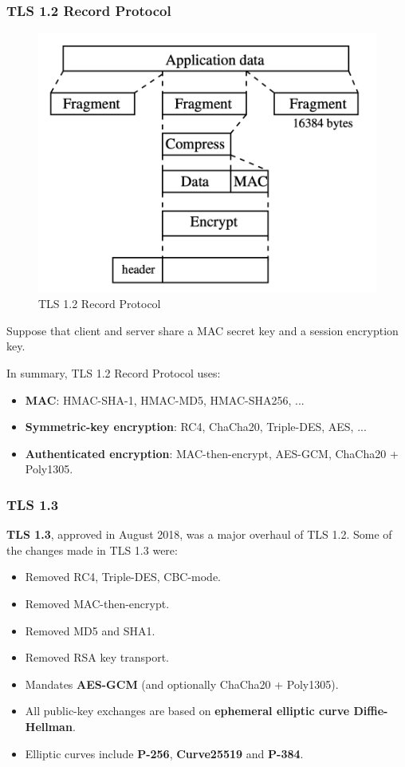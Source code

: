 \documentclass[12pt,titlepage]{article}
\begin{document}
\subsubsection{TLS 1.2 Record Protocol}
\begin{center}
	\begin{figure}[h!]
		\centering
		\includegraphics[width=\textwidth]{TLS_1_2_Record_Protocol.png}
		\caption{TLS 1.2 Record Protocol}
	\end{figure}
	Suppose that client and server share a MAC secret key and a session encryption key.
\end{center}
In summary, TLS 1.2 Record Protocol uses: \begin{itemize}
	\item \textbf{MAC}: HMAC-SHA-1, HMAC-MD5, HMAC-SHA256, ...
	\item \textbf{Symmetric-key encryption}: RC4, ChaCha20, Triple-DES, AES, ...
	\item \textbf{Authenticated encryption}: MAC-then-encrypt, AES-GCM, ChaCha20 + Poly1305.
\end{itemize}
\subsubsection{TLS 1.3}
\textbf{TLS 1.3}, approved in August 2018, was a major overhaul of TLS 1.2. Some of the changes made in TLS 1.3 were:\begin{itemize}
	\item Removed RC4, Triple-DES, CBC-mode.
	\item Removed MAC-then-encrypt.
	\item Removed MD5 and SHA1.
	\item Removed RSA key transport.
	\item Mandates \textbf{AES-GCM} (and optionally ChaCha20 + Poly1305).
	\item All public-key exchanges are based on \textbf{ephemeral elliptic curve Diffie-Hellman}.
	\item Elliptic curves include \textbf{P-256}, \textbf{Curve25519} and \textbf{P-384}.
\end{itemize}
\end{document}
